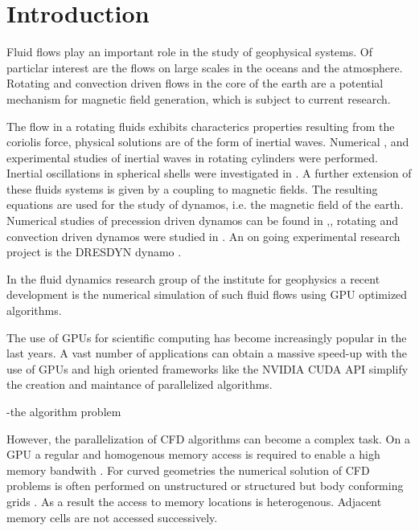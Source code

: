 \chapter*{Introduction}

Fluid flows play an important role in the study of geophysical systems.
Of particlar interest are the flows on large scales in the oceans
and the atmosphere.
Rotating and convection driven flows in the core of the earth are a potential mechanism
for magnetic field generation, which is subject to current research.

The flow in a rotating fluids exhibits characterics properties resulting from the coriolis force,
physical solutions are of the form of inertial waves.
Numerical \citep{Sauret2012}, \citep{Duguet} and experimental studies \citep{QUOTE} of inertial waves in rotating cylinders were performed.
Inertial oscillations in spherical shells were investigated in \citep{Tilgner1999}.
A further extension of these fluids systems is given by a coupling to magnetic fields.
The resulting equations are used for the study of dynamos, i.e. the magnetic field of the earth.
Numerical studies of precession driven dynamos can be found in \citep{Tilgner2005},\citep{Tilgner2007a},
rotating and convection driven dynamos were studied in \citep{Tilgner2012}.
An on going experimental research project is the DRESDYN dynamo \citep{Stefani2015}.


In the fluid dynamics research group of the institute for geophysics
a recent development is the numerical simulation of such fluid flows using GPU optimized algorithms.

The use of GPUs for scientific computing has become increasingly popular in the last years.
A vast number of applications  can obtain a massive speed-up with the use of GPUs and
high oriented frameworks like the NVIDIA CUDA API simplify the creation
and maintance of parallelized algorithms.




-the algorithm problem

However, the parallelization of CFD algorithms can become a complex task.
On a GPU a regular and homogenous memory access is required to enable a high memory bandwith \citep{CUDABP}.
For curved geometries the numerical solution of CFD problems is often performed
on unstructured  or structured but body conforming grids \citep{Mittal2005}.
As a result the access to memory locations is heterogenous.
Adjacent memory cells are not accessed successively.


